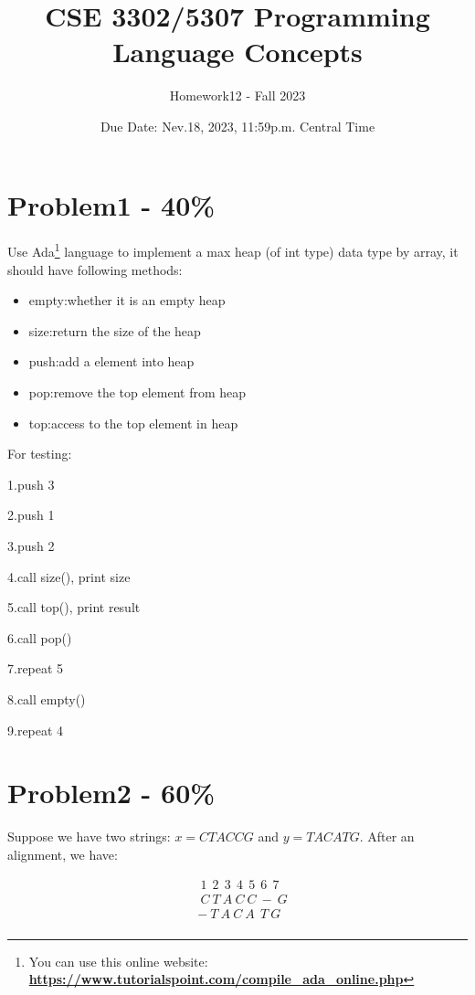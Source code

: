 \documentclass{article}
\begin{document}
\title{CSE 3302/5307 Programming Language Concepts}
\author{Homework12 - Fall 2023}
\date{Due Date: Nev.18, 2023, 11:59p.m. Central Time}
\maketitle
\thispagestyle{fancy}


\section*{Problem1 - 40\%}

Use Ada\footnote{You can use this online website: \href{https://www.tutorialspoint.com/compile_ada_online.php}{\textbf{https://www.tutorialspoint.com/compile\_ada\_online.php}}} language to implement a max heap (of int type) data type by array, it should have following methods:
\begin{itemize}
    \item empty:whether it is an empty heap
    \item size:return the size of the heap
    \item push:add a element into heap
    \item pop:remove the top element from heap
    \item top:access to the top element in heap
\end{itemize}
For testing: 

1.push 3

2.push 1

3.push 2

4.call size(), print size

5.call top(), print result

6.call pop()

7.repeat 5

8.call empty()

9.repeat 4


\section*{Problem2 - 60\%}

Suppose we have two strings: $x=CTACCG$ and $y=TACATG$. After an alignment, we have:

\begin{align*}
    &\ 1\ \ 2\ \ 3\ \ 4\ \ 5\ \ 6\ \ 7\\
    &\ C\ T\ A\ C\ C\ -\ G\\
    &-\ T\ A\ C\ A\ \ T\ G\\
\end{align*}
\end{document}
